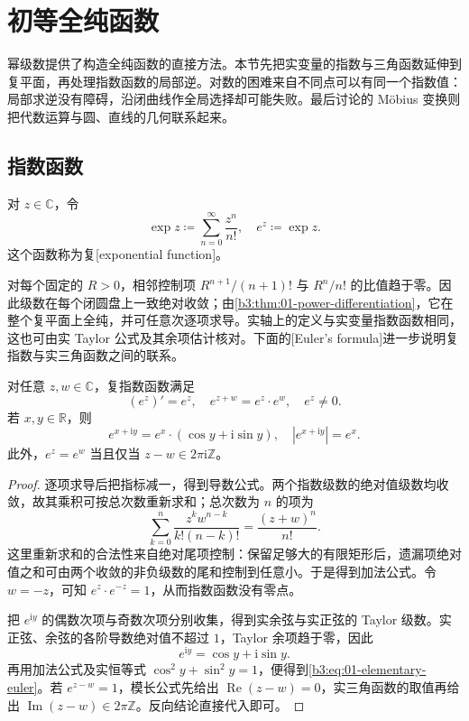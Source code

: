 \section{初等全纯函数}
\label{b3:sec:0103}

幂级数提供了构造全纯函数的直接方法。本节先把实变量的指数与三角函数延伸到复平面，再处理指数函数的局部逆。对数的困难来自不同点可以有同一个指数值：局部求逆没有障碍，沿闭曲线作全局选择却可能失败。最后讨论的 Möbius 变换则把代数运算与圆、直线的几何联系起来。

\subsection{指数函数}
\label{b3:subsec:010301}

\begin{definition}
\label{b3:def:01-elementary-exp}
对 \(z\in\mathbb C\)，令
\[
\exp z\coloneqq\sum_{n=0}^{\infty}\frac{z^n}{n!},
\quad e^z\coloneqq\exp z.
\]
这个函数称为复[exponential function]。
\end{definition}

对每个固定的 \(R>0\)，相邻控制项 \(R^{n+1}/(n+1)!\) 与 \(R^n/n!\) 的比值趋于零。因此级数在每个闭圆盘上一致绝对收敛；由\cref{b3:thm:01-power-differentiation}，它在整个复平面上全纯，并可任意次逐项求导。实轴上的定义与实变量指数函数相同，这也可由实 Taylor 公式及其余项估计核对。下面的[Euler's formula]进一步说明复指数与实三角函数之间的联系。

\begin{proposition}[Euler 公式]
\label{b3:prop:01-elementary-exp}
对任意 \(z,w\in\mathbb C\)，复指数函数满足
\[
(e^z)'=e^z,
\quad e^{z+w}=e^z\cdot e^w,
\quad e^z\neq0.
\]
若 \(x,y\in\mathbb R\)，则
\begin{equation}
\label{b3:eq:01-elementary-euler}
e^{x+\mathrm{i}y}=e^x\cdot(\cos y+\mathrm{i}\sin y),
\quad |e^{x+\mathrm{i}y}|=e^x.
\end{equation}
此外，\(e^z=e^w\) 当且仅当 \(z-w\in2\pi\mathrm{i}\mathbb Z\)。
\end{proposition}

\begin{proof}
逐项求导后把指标减一，得到导数公式。两个指数级数的绝对值级数均收敛，故其乘积可按总次数重新求和；总次数为 \(n\) 的项为
\[
\sum_{k=0}^{n}\frac{z^kw^{n-k}}{k!(n-k)!}
=\frac{(z+w)^n}{n!}.
\]
这里重新求和的合法性来自绝对尾项控制：保留足够大的有限矩形后，遗漏项绝对值之和可由两个收敛的非负级数的尾和控制到任意小。于是得到加法公式。令 \(w=-z\)，可知 \(e^z\cdot e^{-z}=1\)，从而指数函数没有零点。

把 \(e^{\mathrm{i}y}\) 的偶数次项与奇数次项分别收集，得到实余弦与实正弦的 Taylor 级数。实正弦、余弦的各阶导数绝对值不超过 \(1\)，Taylor 余项趋于零，因此
\[
e^{\mathrm{i}y}=\cos y+\mathrm{i}\sin y.
\]
再用加法公式及实恒等式 \(\cos^2y+\sin^2y=1\)，便得到\eqref{b3:eq:01-elementary-euler}。若 \(e^{z-w}=1\)，模长公式先给出 \(\operatorname{Re}(z-w)=0\)，实三角函数的取值再给出 \(\operatorname{Im}(z-w)\in2\pi\mathbb Z\)。反向结论直接代入即可。
\end{proof}

